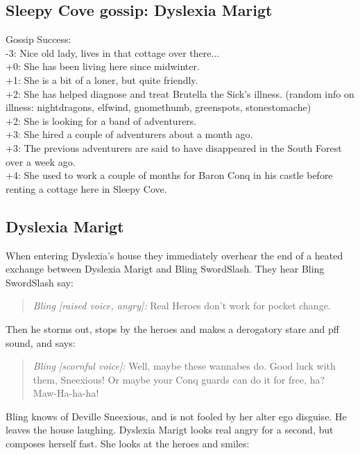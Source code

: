 \documentclass[11pt, twoside, titlepage, a4paper]{report}
\newenvironment{readoutloud}%
{\begin{quote}\begin{itshape}}%
{\end{itshape}\end{quote}}%
\begin{document}
\subsection*{Sleepy Cove gossip: Dyslexia Marigt}
Gossip Success:\\
-3: Nice old lady, lives in that cottage over there...\\
+0: She has been living here since midwinter. \\
+1: She is a bit of a loner, but quite friendly. \\
+2: She has helped diagnose and treat Brutella the Sick's illness. (random info on illness: nightdragons, elfwind, gnomethumb, greenspots, stonestomache) \\
+2: She is looking for a band of adventurers. \\
+3: She hired a couple of adventurers about a month ago. \\
+3: The previous adventurers are said to have disappeared in the South Forest over a week ago. \\
+4: She used to work a couple of months for Baron Conq in his castle before renting a cottage here in Sleepy Cove. \\


\subsection*{Dyslexia Marigt}
When entering Dyslexia's house they immediately overhear the end of a heated exchange between Dyslexia Marigt and Bling SwordSlash. They hear Bling SwordSlash say:
\begin{readoutloud}
\emph{Bling [raised voice, angry]:} Real Heroes don't work for pocket change.
\end{readoutloud}
Then he storms out, stops by the heroes and makes a derogatory stare and pff sound, and says:
\begin{readoutloud}
\emph{Bling [scornful voice]:} Well, maybe these wannabes do. Good luck with them, Sneexious! Or maybe your Conq guards can do it for free, ha? \\
Maw-Ha-ha-ha!
\end{readoutloud}

Bling knows of Deville Sneexious, and is not fooled by her alter ego disguise. He leaves the house laughing.
Dyslexia Marigt looks real angry for a second, but composes herself fast. She looks at the heroes and smiles:
\end{document}
